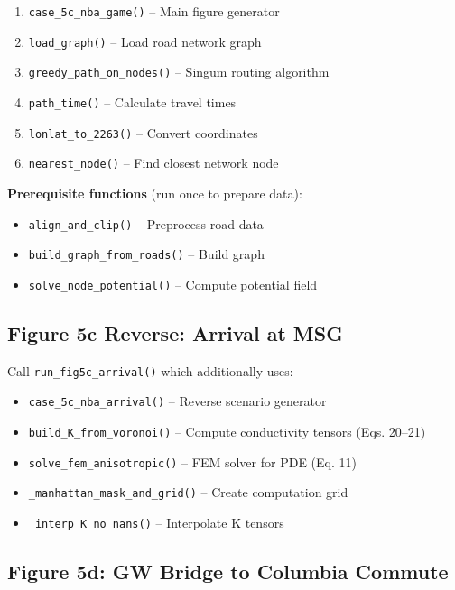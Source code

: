 \documentclass[11pt]{article}
\begin{document}
\begin{enumerate}[noitemsep]
    \item \texttt{case\_5c\_nba\_game()} -- Main figure generator
    \item \texttt{load\_graph()} -- Load road network graph
    \item \texttt{greedy\_path\_on\_nodes()} -- Singum routing algorithm
    \item \texttt{path\_time()} -- Calculate travel times
    \item \texttt{lonlat\_to\_2263()} -- Convert coordinates
    \item \texttt{nearest\_node()} -- Find closest network node
\end{enumerate}

\textbf{Prerequisite functions} (run once to prepare data):
\begin{itemize}[noitemsep]
    \item \texttt{align\_and\_clip()} -- Preprocess road data
    \item \texttt{build\_graph\_from\_roads()} -- Build graph
    \item \texttt{solve\_node\_potential()} -- Compute potential field
\end{itemize}

\subsection{Figure 5c Reverse: Arrival at MSG}

Call \texttt{run\_fig5c\_arrival()} which additionally uses:
\begin{itemize}[noitemsep]
    \item \texttt{case\_5c\_nba\_arrival()} -- Reverse scenario generator
    \item \texttt{build\_K\_from\_voronoi()} -- Compute conductivity tensors (Eqs. 20--21)
    \item \texttt{solve\_fem\_anisotropic()} -- FEM solver for PDE (Eq. 11)
    \item \texttt{\_manhattan\_mask\_and\_grid()} -- Create computation grid
    \item \texttt{\_interp\_K\_no\_nans()} -- Interpolate K tensors
\end{itemize}

\subsection{Figure 5d: GW Bridge to Columbia Commute}
\end{document}
